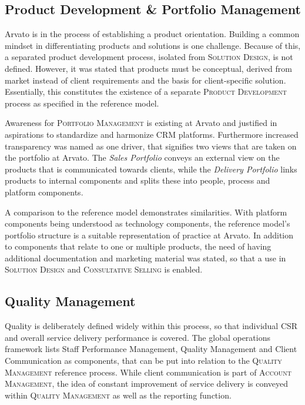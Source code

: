 	\subsection{Product Development \& Portfolio Management}
	
	Arvato is in the process of establishing a product orientation. Building a common mindset in differentiating products and solutions is one challenge. Because of this, a separated product development process, isolated from \textsc{Solution Design}, is not defined. However, it was stated that products must be conceptual, derived from market instead of client requirements and the basis for client-specific solution. Essentially, this constitutes the existence of a separate \textsc{Product Development} process as specified in the reference model. 
	
	Awareness for \textsc{Portfolio Management} is existing at Arvato and justified in aspirations to standardize and harmonize \acrshort{CRM} platforms. Furthermore increased transparency was named as one driver, that signifies two views that are taken on the portfolio at Arvato. The \textit{Sales Portfolio} conveys an external view on the products that is communicated towards clients, while the \textit{Delivery Portfolio} links products to internal components and splits these into people, process and platform components. 
	
	A comparison to the reference model demonstrates similarities. With platform components being understood as technology components, the reference model's portfolio structure is a suitable representation of practice at Arvato. 
	In addition to components that relate to one or multiple products, the need of having additional documentation and marketing material was stated, so that a use in \textsc{Solution Design} and \textsc{Consultative Selling} is enabled. 
	
	\subsection{Quality Management}
	Quality is deliberately defined widely within this process, so that individual \acrshort{CSR} and overall service delivery performance is covered. The global operations framework lists Staff Performance Management, Quality Management and Client Communication as components, that can be put into relation to the \textsc{Quality Management} reference process. While client communication is part of \textsc{Account Management}, the idea of constant improvement of service delivery is conveyed within \textsc{Quality Management} as well as the reporting function. 
	
